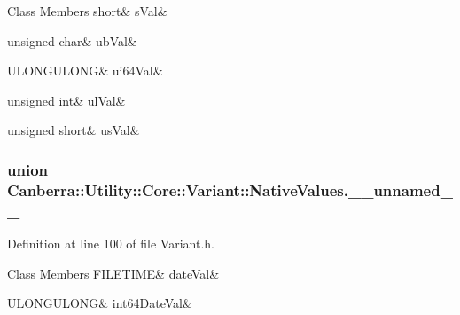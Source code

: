 \begin{DoxyFields}{Class Members}
\mbox{\label{class_canberra_1_1_utility_1_1_core_1_1_variant_a1bc28f13691752668b4cb6f61e02f714}} 
short&
sVal&
\\
\hline

\mbox{\label{class_canberra_1_1_utility_1_1_core_1_1_variant_ab87eaf999ed9da37674c0bcdb6ea87e1}} 
unsigned char&
ubVal&
\\
\hline

\mbox{\label{class_canberra_1_1_utility_1_1_core_1_1_variant_a87770bd55bf6a7e0ff07a92e72f34311}} 
ULONGULONG&
ui64Val&
\\
\hline

\mbox{\label{class_canberra_1_1_utility_1_1_core_1_1_variant_a3a61d4a62de3aa16a4bf91e86c08564e}} 
unsigned int&
ulVal&
\\
\hline

\mbox{\label{class_canberra_1_1_utility_1_1_core_1_1_variant_a3dca8c7ff5841ede91d58129eb115936}} 
unsigned short&
usVal&
\\
\hline

\end{DoxyFields}
\label{union_canberra_1_1_utility_1_1_core_1_1_variant_1_1_native_values_8____unnamed____}
\subsubsection{union Canberra\+:\+:Utility\+:\+:Core\+:\+:Variant\+:\+:Native\+Values.\+\_\+\+\_\+unnamed\+\_\+\+\_\+}


Definition at line 100 of file Variant.\+h.

\begin{DoxyFields}{Class Members}
\mbox{\label{class_canberra_1_1_utility_1_1_core_1_1_variant_a98d353447be3255ee722c11dcfe24ce5}} 
\hyperlink{struct___f_i_l_e_t_i_m_e}{FILETIME}&
dateVal&
\\
\hline

\mbox{\label{class_canberra_1_1_utility_1_1_core_1_1_variant_a5e4636122333c4d2098198138b1344a3}} 
ULONGULONG&
int64DateVal&
\\
\hline

\end{DoxyFields}


